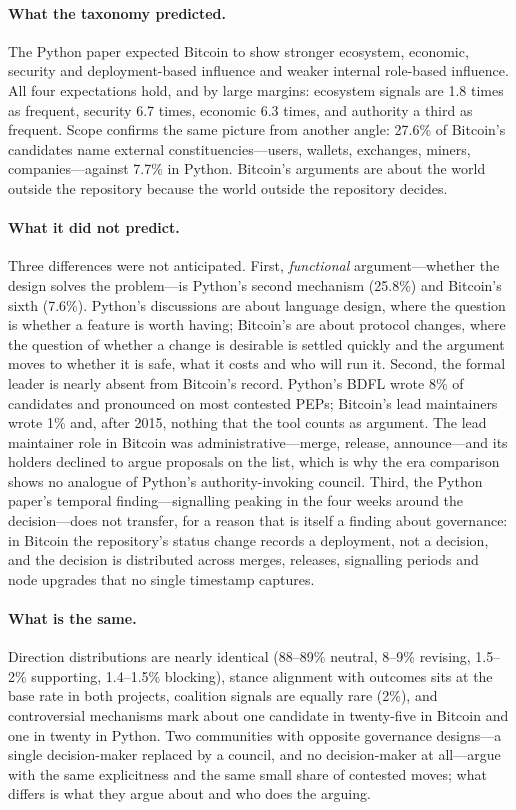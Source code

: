 \paragraph{What the taxonomy predicted.} The Python paper expected Bitcoin to show stronger ecosystem, economic, security and deployment-based influence and weaker internal role-based influence. All four expectations hold, and by large margins: ecosystem signals are 1.8 times as frequent, security 6.7 times, economic 6.3 times, and authority a third as frequent. Scope confirms the same picture from another angle: 27.6\% of Bitcoin's candidates name external constituencies---users, wallets, exchanges, miners, companies---against 7.7\% in Python. Bitcoin's arguments are about the world outside the repository because the world outside the repository decides.

\paragraph{What it did not predict.} Three differences were not anticipated. First, \emph{functional} argument---whether the design solves the problem---is Python's second mechanism (25.8\%) and Bitcoin's sixth (7.6\%). Python's discussions are about language design, where the question is whether a feature is worth having; Bitcoin's are about protocol changes, where the question of whether a change is desirable is settled quickly and the argument moves to whether it is safe, what it costs and who will run it. Second, the formal leader is nearly absent from Bitcoin's record. Python's BDFL wrote 8\% of candidates and pronounced on most contested PEPs; Bitcoin's lead maintainers wrote 1\% and, after 2015, nothing that the tool counts as argument. The lead maintainer role in Bitcoin was administrative---merge, release, announce---and its holders declined to argue proposals on the list, which is why the era comparison shows no analogue of Python's authority-invoking council. Third, the Python paper's temporal finding---signalling peaking in the four weeks around the decision---does not transfer, for a reason that is itself a finding about governance: in Bitcoin the repository's status change records a deployment, not a decision, and the decision is distributed across merges, releases, signalling periods and node upgrades that no single timestamp captures.

\paragraph{What is the same.} Direction distributions are nearly identical (88--89\% neutral, 8--9\% revising, 1.5--2\% supporting, 1.4--1.5\% blocking), stance alignment with outcomes sits at the base rate in both projects, coalition signals are equally rare (2\%), and controversial mechanisms mark about one candidate in twenty-five in Bitcoin and one in twenty in Python. Two communities with opposite governance designs---a single decision-maker replaced by a council, and no decision-maker at all---argue with the same explicitness and the same small share of contested moves; what differs is what they argue about and who does the arguing.

